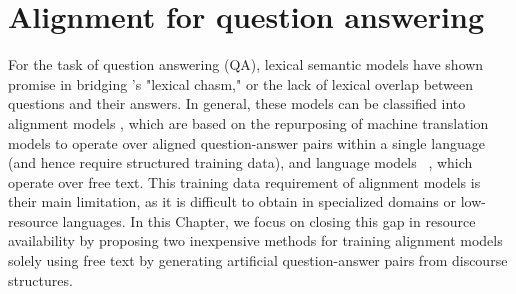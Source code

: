 

\section{Alignment for question answering}
\label{sec-naacl2015:intro}


For the task of question answering (QA), lexical semantic models have shown promise in bridging \citet{Berger:00}'s "lexical chasm," or the lack of lexical overlap between questions and their answers.  In general, these models can be classified into alignment models \citep{echihabi2003noisy,Soricut:06,Riezler:etal:2007,Surdeanu:11,yao2013}, which are based on the repurposing of machine translation models to operate over aligned question-answer pairs within a single language (and hence require structured training data), and language models ~\citep{jansen14,sultan-etal:2014:TACL,yih13}, which operate over free text.  
This training data requirement of alignment models is their main limitation, as it is difficult to obtain in specialized domains or low-resource languages.
In this Chapter, we focus on closing this gap in resource availability by proposing two inexpensive methods for training alignment models solely using free text by generating artificial question-answer pairs from discourse structures. 


